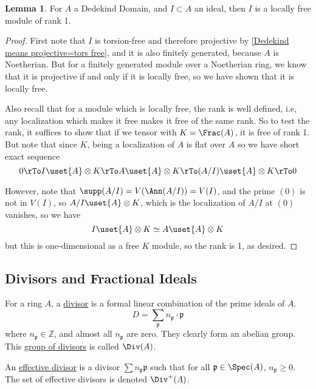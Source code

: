 \documentclass[12 pt]{article}
\theoremstyle{definition}
\newtheorem{lemma}[theorem]{Lemma}
\newcommand\zz{\mathbb{Z}}
\newcommand\fp{{\mathfrak p}}
\begin{document}
\begin{lemma} For $A$ a Dedekind Domain, and $I \subset A$ an ideal, then $I$ is a locally free module of rank 1.
\end{lemma}
\begin{proof}
First note that $I$ is torsion-free and therefore projective by \ref{Dedekind means projective=tors free}, and it is also finitely generated, because $A$ is Noetherian. But for a finitely generated module over a Noetherian ring, we know that it is projective if and only if it is locally free, so we have shown that it is locally free.

Also recall that for a module which is locally free, the rank is well defined, i.e, any localization which makes it free makes it free of the same rank. So to test the rank, it suffices to show that if we tensor with $K=\Frac(A)$, it is free of rank 1. But note that since $K$, being a localization of $A$ is flat over $A$ so we have short exact sequence
\[0 \rTo I \uset{A}\otimes K \rTo A \uset{A}\otimes K \rTo (A/I) \uset{A}\otimes K \rTo 0\]

However, note that $\supp(A/I)=V(\Ann(A/I))=V(I)$, and the prime $(0)$ is not in $V(I)$, so $A/I \uset{A}\otimes K$, which is the localization of $A/I$ at $(0)$ vanishes, so we have
\[I \uset{A}\otimes K \simeq A \uset{A}\otimes K\]
but this is one-dimensional as a free $K$ module, so the rank is 1, as desired.
\end{proof}




\subsection{Divisors and Fractional Ideals}

\begin{definition} For a ring $A$, a \uline{divisor} is a formal linear combination of the prime ideals of $A$.
\[D=\sum_{\fp} n_{\fp} \cdot \fp\]
where $n_{\fp} \in \zz$, and almost all $n_{\fp}$ are zero. They clearly form an abelian group. This \uline{group of divisors} is called $\Div(A)$.

An \uline{effective divisor} is a divisor $\sum n_{\fp} \fp$ such that for all $\fp \in \Spec(A)$, $n_\fp \geq 0$. The set of effective divisors is denoted $\Div^+(A)$.
\end{definition}
\end{document}
